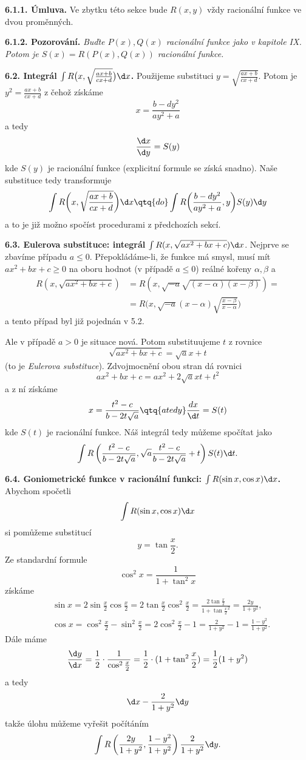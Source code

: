 \documentclass[12pt]{article}
\begin{document}
{ {\bf 6.1.1. Úmluva.} Ve zbytku této sekce  bude $ R(x,y)$ vždy racionální funkce ve dvou proměnných.
 
 
 \medskip
 
 {\bf 6.1.2. Pozorování.} {\em Buďte $P(x),Q(x)$ racionální funkce jako v kapitole IX. Potom je $S(x)=R(P(x),Q(x))$ racionální funkce.}
 
 \bigskip
 
 {\bf 6.2. Integrál $\int R\big(x,\sqrt{\frac{ax+b}{cx+d}}\big)\d x$.} Použijeme substituci $y=\sqrt{\frac{ax+b}{cx+d}}$. Potom je
 $y^2=\frac{ax+b}{cx+d}$ z čehož získáme
$$
 x=\frac{b-dy^2}{ay^2+a}
 $$
 a tedy
 $$
 \frac{\d x}{\d y}=S(y)
 $$
 kde $S(y)$ je racionální funkce (explicitní formule se získá snadno).  Naše substituce tedy transformuje
 $$
 \int R\bigg(x,\sqrt{\frac{ax+b}{cx+d}}\bigg)\d x\qtq{do} \int R\bigg(\frac{b-dy^2}{ay^2+a},y\bigg)S(y)\d y
 $$
 a to je již možno spočíst procedurami z předchozích sekcí.
 
 \bigskip
 
 {\bf 6.3. Eulerova substituce: integrál} $\int R(x,\sqrt{ax^2+bx+c})\d x$. Nejprve se zbavíme případu 
$a\leq 0$. Přepokládáme-li, že funkce má smysl, musí mít $ax^2+bx+c\geq 0$ na oboru hodnot (v případě $a\leq 0$)  reálné kořeny $\alpha,\beta$ a
 $$
 \begin{aligned}
  R(x,\sqrt{ax^2+bx+c})&=R(x,\sqrt{-a}\sqrt{(x-\alpha)(x-\beta)})=\\
 &=R\big(x,\sqrt{-a}(x-\alpha)\sqrt{\frac{x-\beta}{x-\alpha}}\big)
 \end{aligned}
  $$
  a tento případ byl již pojednán v 5.2.
  
  \smallskip
  
  Ale v případě $a>0$ je situace nová. Potom substituujeme $t$ z rovnice
  $$
  \sqrt{ax^2+bx+c}=\sqrt{a}x+t
  $$
  (to je {\em Eulerova substituce}). Zdvojmocnění obou stran dá rovnici
  $$
  ax^2+bx+c=ax^2+2\sqrt{a}xt + t^2
  $$
  a z ní získáme 
  $$
  x=\frac{t^2-c}{b-2t\sqrt{a}} \qtq{a tedy} \frac{d x}{\d t}=S(t)
$$
kde $S(t)$ je racionální funkce.
Náš integrál tedy můžeme spočítat jako
$$
\int R\left(\frac{t^2-c}{b-2t\sqrt{a}},\sqrt{a}\frac{t^2-c}{b-2t\sqrt{a}}+t\right)S(t)\d t.
$$

\bigskip

{\bf 6.4. Goniometrické funkce v racionální funkci: $\int R(\sin x,\cos x)\d x$.} Abychom spočetli
$$
\int R(\sin x,\cos x)\d x
$$
si pomůžeme  substitucí
$$
y=\tan\frac{x}{2}.
$$
Ze standardní formule
$$
\cos^2x=\frac{1}{1+\tan^2x}
$$
získáme
$$
\begin{aligned}
&\sin x=2\sin\frac{x}{2}\cos\frac{x}{2}=2\tan\frac{x}{2}\cos^2\frac{x}{2}=
\frac{2\tan\frac{x}{2}}{1+\tan\frac{x}{2}^2}=\frac{2y}{1+y^2},\\
&\cos x=\cos^2\frac{x}{2}-\sin^2\frac{x}{2}=2\cos^2\frac{x}{2}-1=
\frac{2}{1+y^2}-1=\frac{1-y^2}{1+y^2}.
\end{aligned}
$$
Dále máme
$$
\frac{\d y}{\d x}=\frac12\cdot\frac{1}{\cos^2\frac{x}{2}}=
\frac12\cdot(1+\tan^2\frac{x}{2})=\frac12(1+y^2)
$$
a tedy
$$
\d x-\frac{2}{1+y^2}\d y
$$
takže úlohu můžeme vyřešit počítáním
$$
\int R\left(\frac{2y}{1+y^2},\frac{1-y^2}{1+y^2}\right)\frac{2}{1+y^2}\d y.
$$

}
\end{document}

